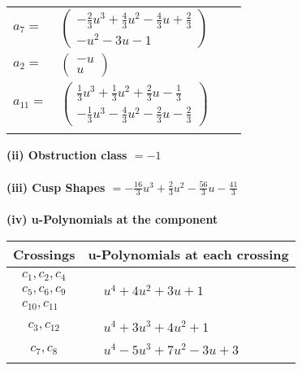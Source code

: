 \documentclass[1p]{elsarticle_modified}
\theoremstyle{definition}
\begin{document}
\begin{tabular}{m{7pt} m{180pt} m{7pt} m{180pt} }
\flushright $a_{7}=$&$\begin{pmatrix}-\frac{2}{3} u^3+\frac{4}{3} u^2-\frac{4}{3} u+\frac{2}{3}\\- u^2-3 u-1\end{pmatrix}$ \\
\flushright $a_{2}=$&$\begin{pmatrix}- u\\u\end{pmatrix}$ \\
\flushright $a_{11}=$&$\begin{pmatrix}\frac{1}{3} u^3+\frac{1}{3} u^2+\frac{2}{3} u-\frac{1}{3}\\-\frac{1}{3} u^3-\frac{4}{3} u^2-\frac{2}{3} u-\frac{2}{3}\end{pmatrix}$\\&\end{tabular}
\flushleft \textbf{(ii) Obstruction class $= -1$}\\~\\
\flushleft \textbf{(iii) Cusp Shapes $= -\frac{16}{3} u^3+\frac{2}{3} u^2-\frac{56}{3} u-\frac{41}{3}$}\\~\\
\newpage\renewcommand{\arraystretch}{1}
\flushleft \textbf{(iv) u-Polynomials at the component}\newline \\
\begin{tabular}{m{50pt}|m{274pt}}
Crossings & \hspace{64pt}u-Polynomials at each crossing \\
\hline $$\begin{aligned}c_{1},c_{2},c_{4}\\c_{5},c_{6},c_{9}\\c_{10},c_{11}\end{aligned}$$&$\begin{aligned}
&u^4+4 u^2+3 u+1
\end{aligned}$\\
\hline $$\begin{aligned}c_{3},c_{12}\end{aligned}$$&$\begin{aligned}
&u^4+3 u^3+4 u^2+1
\end{aligned}$\\
\hline $$\begin{aligned}c_{7},c_{8}\end{aligned}$$&$\begin{aligned}
&u^4-5 u^3+7 u^2-3 u+3
\end{aligned}$\\
\hline
\end{tabular}\\~\\
\end{document}
